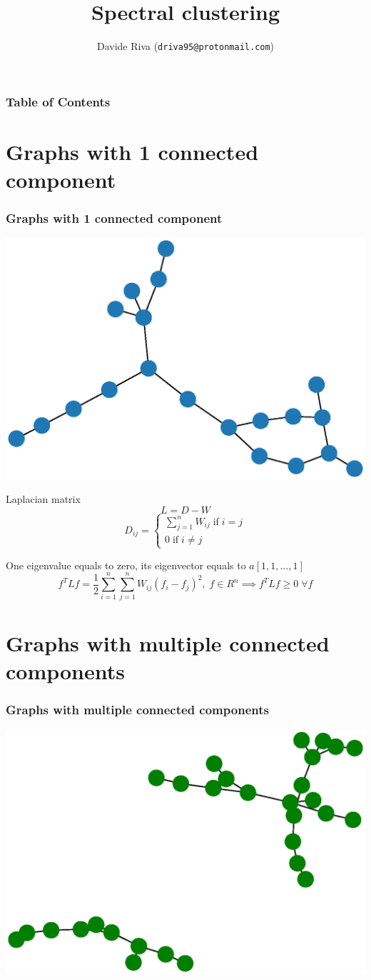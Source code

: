 \documentclass{beamer}
\title{Spectral clustering}
\author{%
  Davide Riva
  (\texttt{driva95@protonmail.com})
}
\begin{document}
\frame{\titlepage}

\begin{frame}
  \frametitle{Table of Contents}
  \tableofcontents
\end{frame}

\section{Graphs with 1 connected component}
\begin{frame}
  \frametitle{Graphs with 1 connected component}
  \centering
  \includegraphics[width=0.5\linewidth]{figures/one-component.eps}
\end{frame}
\begin{frame}
  \begin{block}{Laplacian matrix}
    \[ L = D - W \]
    \[ D_{ij} = \begin{cases} \sum_{j=1}^n W_{ij} \; \text{if} \; i = j \\ 0 \; \text{if} \; i \neq j \end{cases} \]
  \end{block}

  \begin{alertblock}{One eigenvalue equals to zero, its eigenvector equals to $a [1, 1, \dots, 1]$}
    \[ f^T L f = \frac{1}{2} \sum_{i=1}^n \sum_{j=1}^n W_{ij} (f_i - f_j)^2, \; f \in \mathit{R}^n
      \implies f^T L f \geq 0 \; \forall f \]
  \end{alertblock}
\end{frame}

\section{Graphs with multiple connected components}
\begin{frame}
  \frametitle{Graphs with multiple connected components}
  \centering
  \includegraphics[width=0.5\linewidth]{figures/multiple-component.eps}
\end{frame}
\end{document}
